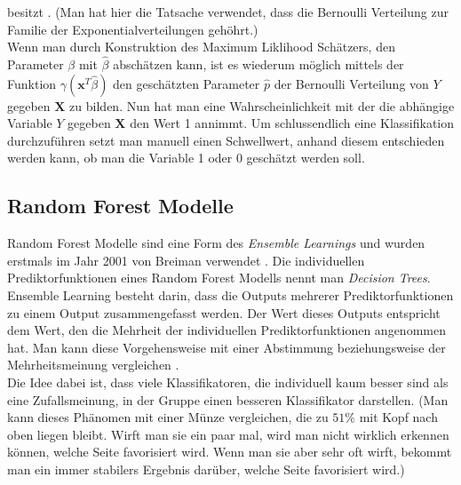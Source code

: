 besitzt \cite{wasserman}. (Man hat hier die Tatsache verwendet, dass die Bernoulli Verteilung zur Familie der Exponentialverteilungen geh\"ohrt.) \\ 

Wenn man durch Konstruktion des Maximum Liklihood Sch\"atzers, den Parameter $\beta$ mit $\hat{\beta}$ absch\"atzen kann, ist es wiederum m\"oglich mittels der Funktion $\gamma(\mathbf{x}^T\hat{\beta})$
den gesch\"atzten Parameter $\hat{p}$ der Bernoulli Verteilung von $Y$ gegeben $\mathbf{X}$ zu bilden. Nun hat man eine Wahrscheinlichkeit mit der die abh\"angige Variable $Y$ gegeben $\mathbf{X}$ den Wert 1 annimmt.
Um schlussendlich eine Klassifikation durchzuf\"uhren setzt man manuell einen Schwellwert, anhand diesem entschieden werden kann, ob man die Variable 1 oder 0 gesch\"atzt werden soll. 
























\subsection{Random Forest Modelle}
Random Forest Modelle sind eine Form des \textit{Ensemble Learnings} und wurden erstmals im Jahr 2001 von Breiman verwendet \cite{breiman2001random}. 
Die individuellen Prediktorfunktionen eines Random 
Forest Modells nennt man \textit{Decision Trees}.
Ensemble Learning besteht darin, dass die Outputs mehrerer Prediktorfunktionen zu einem Output zusammengefasst werden. Der Wert dieses Outputs entspricht
dem Wert, den die Mehrheit der individuellen Prediktorfunktionen angenommen hat.
Man kann diese Vorgehensweise mit einer Abstimmung beziehungsweise der Mehrheitsmeinung vergleichen \cite{handson}. \\

Die Idee dabei ist, dass viele Klassifikatoren, die individuell kaum besser sind als eine Zufallsmeinung, in der Gruppe einen 
besseren Klassifikator darstellen. (Man kann dieses Ph\"anomen mit einer M\"unze vergleichen, die zu $51\%$ mit Kopf nach oben liegen bleibt. Wirft 
man sie ein paar mal, wird man nicht wirklich erkennen k\"onnen, welche Seite favorisiert wird. Wenn man sie aber sehr oft wirft, bekommt man 
ein immer stabilers Ergebnis dar\"uber, welche Seite favorisiert wird.) \\

